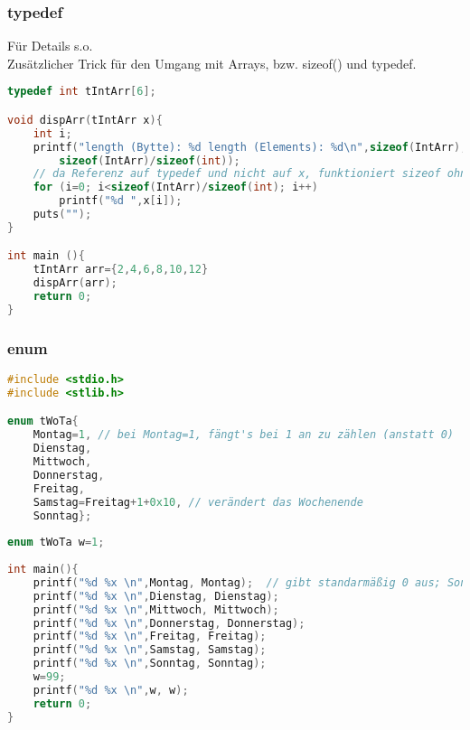 \subsubsection{typedef}
Für Details s.o. \\
Zusätzlicher Trick für den Umgang mit Arrays, bzw. sizeof() und typedef.
\begin{lstlisting}[language=C]
typedef int tIntArr[6];

void dispArr(tIntArr x){
	int i;
	printf("length (Bytte): %d length (Elements): %d\n",sizeof(IntArr),
		sizeof(IntArr)/sizeof(int));
	// da Referenz auf typedef und nicht auf x, funktioniert sizeof ohne Probleme
	for (i=0; i<sizeof(IntArr)/sizeof(int); i++)	
		printf("%d ",x[i]);
	puts("");
}

int main (){
	tIntArr arr={2,4,6,8,10,12}
	dispArr(arr);
	return 0;
}
\end{lstlisting}

\subsubsection{enum}

\begin{lstlisting}[language=C]
#include <stdio.h>
#include <stlib.h>

enum tWoTa{
	Montag=1, // bei Montag=1, fängt's bei 1 an zu zählen (anstatt 0)
	Dienstag, 
	Mittwoch, 
	Donnerstag,
	Freitag,
	Samstag=Freitag+1+0x10,	// verändert das Wochenende
	Sonntag};
	
enum tWoTa w=1;
	
int main(){
	printf("%d %x \n",Montag, Montag);	// gibt standarmäßig 0 aus; Sonntag wäre 6 usw.
	printf("%d %x \n",Dienstag, Dienstag);
	printf("%d %x \n",Mittwoch, Mittwoch);
	printf("%d %x \n",Donnerstag, Donnerstag);
	printf("%d %x \n",Freitag, Freitag);
	printf("%d %x \n",Samstag, Samstag);
	printf("%d %x \n",Sonntag, Sonntag);
	w=99;	
	printf("%d %x \n",w, w);
	return 0;
}
\end{lstlisting}
